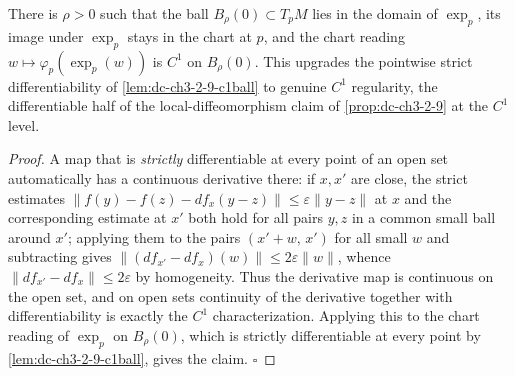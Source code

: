 \begin{lemma}
  \label{lem:dc-ch3-2-9-c1}
  \leanok
  There is $\rho > 0$ such that the ball $B_\rho(0) \subset T_pM$ lies in the
  domain of $\exp_p$, its image under $\exp_p$ stays in the chart at $p$, and
  the chart reading $w \mapsto \varphi_p(\exp_p(w))$ is $C^1$ on $B_\rho(0)$.
  This upgrades the pointwise strict differentiability of
  \cref{lem:dc-ch3-2-9-c1ball} to genuine $C^1$ regularity, the differentiable
  half of the local-diffeomorphism claim of \cref{prop:dc-ch3-2-9} at the
  $C^1$ level.
\end{lemma}
\begin{proof}
  \leanok
  A map that is \emph{strictly} differentiable at every point of an open set
  automatically has a continuous derivative there: if $x, x'$ are close, the
  strict estimates
  $\|f(y) - f(z) - df_x(y - z)\| \le \varepsilon \|y - z\|$ at $x$ and the
  corresponding estimate at $x'$ both hold for all pairs $y, z$ in a common
  small ball around $x'$; applying them to the pairs $(x' + w,\, x')$ for all
  small $w$ and subtracting gives
  $\|(df_{x'} - df_x)(w)\| \le 2\varepsilon \|w\|$, whence
  $\|df_{x'} - df_x\| \le 2\varepsilon$ by homogeneity. Thus the derivative
  map is continuous on the open set, and on open sets continuity of the
  derivative together with differentiability is exactly the $C^1$
  characterization. Applying this to the chart reading of $\exp_p$ on
  $B_\rho(0)$, which is strictly differentiable at every point by
  \cref{lem:dc-ch3-2-9-c1ball}, gives the claim. $\square$
\end{proof}

